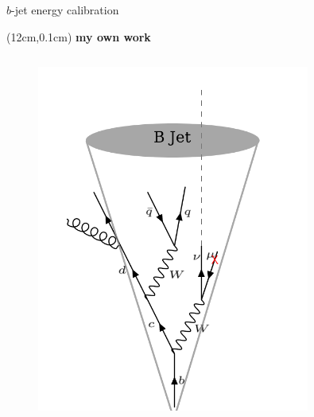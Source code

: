 \begin{frame}{$b$-jet energy calibration}

\begin{textblock*}{5cm}(12cm,0.1cm) %
   \textcolor{HHred}{\Large\textbf{my own work}}
\end{textblock*}

\begin{columns}
\begin{figure}
    \centering
    \includegraphics[width=0.8\textwidth]{Part3/Img/b-jet.png}
\end{figure}



\end{columns}
\end{frame}
